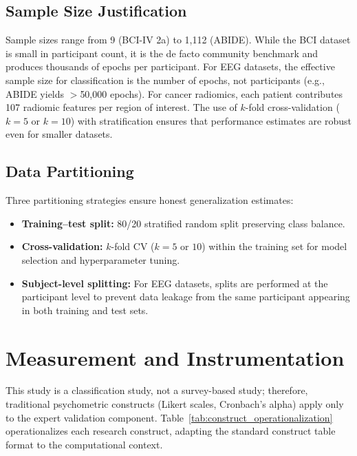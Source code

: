 \subsection{Sample Size Justification}

Sample sizes range from 9 (BCI-IV 2a) to 1,112 (ABIDE). While the BCI dataset is small in participant count, it is the de facto community benchmark and produces thousands of epochs per participant. For EEG datasets, the effective sample size for classification is the number of epochs, not participants (e.g., ABIDE yields $>$50,000 epochs). For cancer radiomics, each patient contributes 107 radiomic features per region of interest. The use of $k$-fold cross-validation ($k = 5$ or $k = 10$) with stratification ensures that performance estimates are robust even for smaller datasets.

\subsection{Data Partitioning}

Three partitioning strategies ensure honest generalization estimates:

\begin{itemize}
    \item \textbf{Training--test split:} 80/20 stratified random split preserving class balance.
    \item \textbf{Cross-validation:} $k$-fold CV ($k = 5$ or $10$) \citep{kohavi1995crossvalidation} within the training set for model selection and hyperparameter tuning.
    \item \textbf{Subject-level splitting:} For EEG datasets, splits are performed at the participant level to prevent data leakage from the same participant appearing in both training and test sets.
\end{itemize}

\section{Measurement and Instrumentation}
\label{sec:measurement}

This study is a classification study, not a survey-based study; therefore, traditional psychometric constructs (Likert scales, Cronbach's alpha) apply only to the expert validation component. Table~\ref{tab:construct_operationalization} operationalizes each research construct, adapting the standard construct table format to the computational context.

